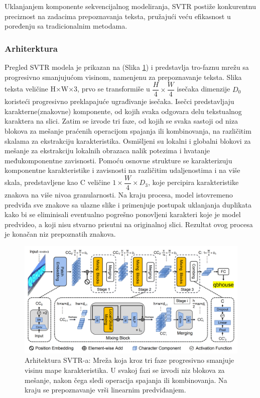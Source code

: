 \documentclass[a4paper,12pt]{article}
\begin{document}
	Uklanjanjem komponente sekvencijalnog modeliranja, SVTR postiže konkurentnu preciznost na zadacima prepoznavanja teksta, pružajući veću efikasnost u poređenju sa tradicionalnim metodama.
	
	\subsubsection{Arhiterktura}

	Pregled SVTR modela je prikazan na (Slika \ref{fig:svtr-architecture}) i predstavlja tro-faznu mrežu sa progresivno smanjujućom visinom, namenjenu za prepoznavanje teksta. Slika teksta veličine H×W×3, prvo se transformiše u \(\dfrac{H}{4} \times \dfrac{W}{4}\) isečaka dimenzije \(D_0\) koristeći progresivno preklapajuće ugrađivanje isečaka. Isečci predstavljaju karakterne(znakovne) komponente, od kojih svaka odgovara delu tekstualnog karaktera na slici. Zatim se izvode tri faze, od kojih se svaka sastoji od niza blokova za mešanje praćenih operacijom spajanja ili kombinovanja, na različitim skalama za ekstrakciju karakteristika. Osmišljeni su lokalni i globalni blokovi za mešanje za ekstrakciju lokalnih obrazaca nalik potezima i hvatanje međukomponentne zavisnosti. Pomoću osnovne strukture se karakterizuju komponentne karakteristike i zavisnosti na različitim udaljenostima i na više skala, predstavljene kao C veličine \(1 \times \dfrac{W}{4} \times D_3\), koje percipira karakteristike znakova na više nivoa granularnosti. Na kraju procesa, model istovremeno predviđa sve znakove sa ulazne slike i primenjuje postupak uklanjanja duplikata kako bi se eliminisali eventualno pogrešno ponovljeni karakteri koje je model predvideo, a koji nisu stvarno prisutni na originalnoj slici. Rezultat ovog procesa je konačan niz prepoznatih znakova.

	\begin{figure}[H]
		\centering
		\includegraphics[width=\textwidth]{assets/svtr-architecture.png}
		\caption{Arhitektura SVTR-a: Mreža koja kroz tri faze progresivno smanjuje visinu mape karakteristika. U svakoj fazi se izvodi niz blokova za mešanje, nakon čega sledi operacija spajanja ili kombinovanja. Na kraju se prepoznavanje vrši linearnim predviđanjem.}
		\label{fig:svtr-architecture}
	\end{figure}
	
\end{document}
